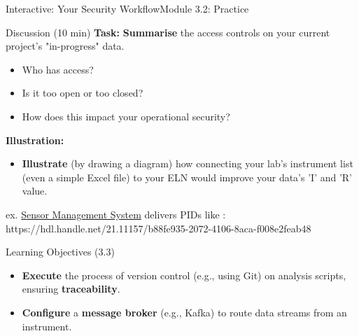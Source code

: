 \begin{frame}{Interactive: Your Security Workflow}{Module 3.2: Practice}
    \begin{block}{Discussion (10 min)}
        \textbf{Task:} \textbf{Summarise} the access controls on your current project's "in-progress" data.
        \pause
        \begin{itemize}
            \item Who has access?
            \item Is it too open or too closed?
            \item How does this impact your operational security?
        \end{itemize}
        \pause
        \textbf{Illustration:}
        \begin{itemize}
            \item \textbf{Illustrate} (by drawing a diagram) how connecting your lab's instrument list (even a simple Excel file) to your ELN would improve your data's 'I' and 'R' value.
        \end{itemize}
    \end{block}
    ex. \href{https://sms.atmohub.kit.edu}{Sensor Management System} delivers PIDs like :
    https://hdl.handle.net/21.11157/b88fe935-2072-4106-8aca-f008e2feab48
\end{frame}

\begin{frame}{Learning Objectives (3.3)}
    \begin{itemize}
        \item \textbf{Execute} the process of version control (e.g., using Git) on analysis scripts, ensuring \textbf{traceability}.
        \item \textbf{Configure} a \textbf{message broker} (e.g., Kafka) to route data streams from an instrument.
    \end{itemize}
\end{frame}

